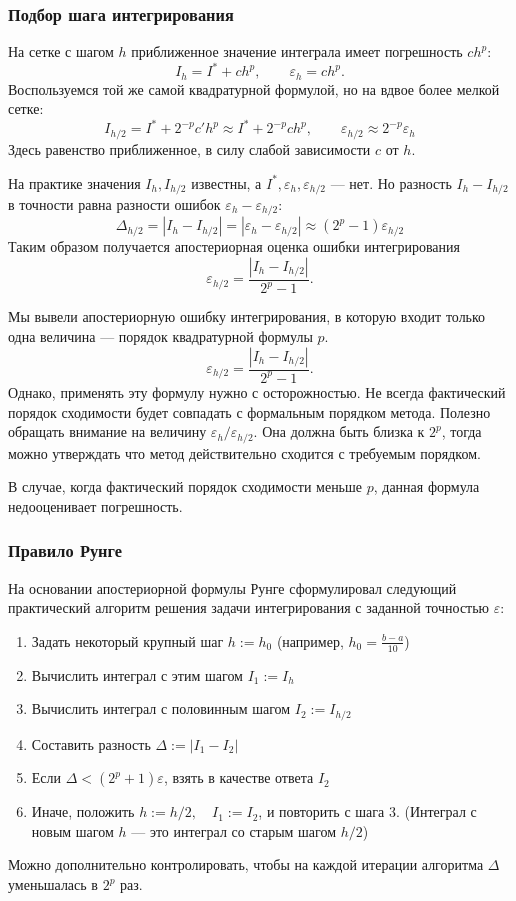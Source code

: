 \documentclass[aspectratio=169,unicode]{beamer}
\begin{document}
\begin{frame}
\frametitle{Подбор шага интегрирования}
	На сетке с шагом $h$ приближенное значение интеграла имеет погрешность $ch^p$:
	\[
		I_h = I^* + c h^p, \qquad \varepsilon_h = c h^p.
	\]
	Воспользуемся той же самой квадратурной формулой, но на вдвое более мелкой
	сетке:
	\[
		I_{h/2} = I^* + 2^{-p} c' h^p \approx I^* + 2^{-p} c h^p, \qquad
		\varepsilon_{h/2} \approx 2^{-p} \varepsilon_h
	\]
	Здесь равенство приближенное, в силу слабой зависимости $c$ от $h$.

	На практике значения $I_{h}, I_{h/2}$ известны, а $I^{*}, \varepsilon_{h},
	\varepsilon_{h/2}$ --- нет. Но разность $I_h - I_{h/2}$ в точности равна
	разности ошибок $\varepsilon_h - \varepsilon_{h/2}$:
	\[
		\Delta_{h/2} = |I_h - I_{h/2}| = |\varepsilon_{h} - \varepsilon_{h/2}| \approx
		(2^p - 1) \varepsilon_{h/2}
	\]
	Таким образом получается апостериорная оценка ошибки интегрирования
	\[
		\varepsilon_{h/2} = \frac{|I_h - I_{h/2}|}{2^p - 1}.
	\]
\end{frame}

\begin{frame}
	Мы вывели апостериорную ошибку интегрирования, в которую входит только одна
	величина --- порядок квадратурной формулы $p$.
	\[
		\varepsilon_{h/2} = \frac{|I_h - I_{h/2}|}{2^p - 1}.
	\]
	Однако, применять эту формулу нужно с осторожностью. Не всегда фактический
	порядок сходимости будет совпадать с формальным порядком метода. Полезно
	обращать внимание на величину $\varepsilon_{h} / \varepsilon_{h/2}$. Она должна
	быть близка к $2^p$, тогда можно утверждать что метод действительно сходится с
	требуемым порядком.

	В случае, когда фактический порядок сходимости меньше $p$, данная формула
	недооценивает погрешность.
\end{frame}

\begin{frame}
\frametitle{Правило Рунге}
	На основании апостериорной формулы Рунге сформулировал следующий практический
	алгоритм решения задачи интегрирования с заданной точностью $\varepsilon$:
	\begin{enumerate}
	\item Задать некоторый крупный шаг $h := h_0$ (например, $h_0 = \frac{b-a}{10}$)
	\item Вычислить интеграл с этим шагом $I_1 := I_{h}$
	\item Вычислить интеграл с половинным шагом $I_2 := I_{h / 2}$
	\item Составить разность $\Delta := |I_1 - I_2|$
	\item Если $\Delta < (2^p + 1)\varepsilon$, взять в качестве ответа
	$I_2$
	\item Иначе, положить $h := h / 2,\quad I_1 := I_2$, и повторить с шага 3. (Интеграл с новым
	шагом $h$ --- это интеграл со старым шагом $h/2$)
	\end{enumerate}
	Можно дополнительно контролировать, чтобы на каждой итерации алгоритма $\Delta$
	уменьшалась в $2^p$ раз.
\end{frame}
\end{document}
